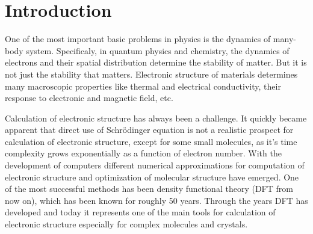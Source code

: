 \documentclass[openany, longbibliography,slovene,a4paper,12pt]{article}
\begin{document}
\section{Introduction}
One of the most important basic problems in physics is the dynamics of many-body system. Specificaly, in quantum physics and chemistry, the dynamics of electrons and their spatial distribution determine the stability of matter. But it is not just the stability that matters. Electronic structure of materials determines many macroscopic properties like thermal and electrical conductivity, their response to electronic and magnetic field, etc.

Calculation of electronic structure has always been a challenge. It quickly
became apparent that direct use of Schr{\"o}dinger equation is not a realistic
prospect for calculation of electronic structure, except for some small
molecules, as it's time complexity grows exponentially as a function of electron
number. With the development of computers different numerical approximations for
computation of electronic structure and optimization of molecular structure have
emerged. One of the most successful methods has been density functional theory (DFT from now on), which has been known for roughly 50 years. Through the years DFT has developed and today it represents one of the main tools for calculation of electronic structure especially for complex molecules and crystals.
\end{document}
